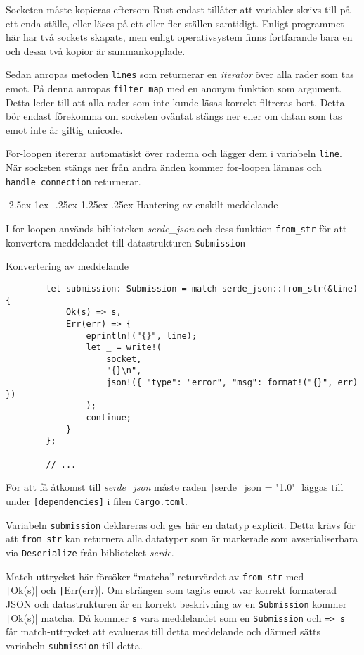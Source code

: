 \documentclass{article}
\makeatletter
\renewcommand\paragraph{\@startsection{paragraph}{4}{\z@}%
			{-2.5ex\@plus -1ex \@minus -.25ex}%
			{1.25ex \@plus .25ex}%
			{\normalfont\normalsize\bfseries}}
\makeatother
\begin{document}
Socketen måste kopieras eftersom Rust endast tillåter att variabler skrivs till
på ett enda ställe, eller läses på ett eller fler ställen samtidigt. Enligt
programmet här har två sockets skapats, men enligt operativsystem finns
fortfarande bara en och dessa två kopior är sammankopplade.

Sedan anropas metoden \texttt{lines} som returnerar en \textit{iterator} över
alla rader som tas emot. På denna anropas \texttt{filter\_map} med en anonym
funktion som argument. Detta leder till att alla rader som inte kunde läsas
korrekt filtreras bort. Detta bör endast förekomma om socketen oväntat stängs
ner eller om datan som tas emot inte är giltig unicode.

For-loopen itererar automatiskt över raderna och lägger dem i variabeln
\texttt{line}. När socketen stängs ner från andra änden kommer for-loopen lämnas
och \texttt{handle\_connection} returnerar.

\paragraph{Hantering av enskilt meddelande}

I for-loopen används biblioteken \textit{serde\_json} och dess funktion
\texttt{from\_str} för att konvertera meddelandet till datastrukturen
\texttt{Submission}

\begin{listing}[H]
	\caption{Konvertering av meddelande}
	\begin{verbatim}
		let submission: Submission = match serde_json::from_str(&line) {
			Ok(s) => s,
			Err(err) => {
				eprintln!("{}", line);
				let _ = write!(
					socket,
					"{}\n",
					json!({ "type": "error", "msg": format!("{}", err) })
				);
				continue;
			}
		};

		// ...
	\end{verbatim}
\end{listing}

För att få åtkomst till \textit{serde\_json} måste raden
\texttt|serde_json = "1.0"| läggas till under \texttt{[dependencies]} i
filen \texttt{Cargo.toml}.

Variabeln \texttt{submission} deklareras och ges här en datatyp explicit. Detta
krävs för att \texttt{from\_str} kan returnera alla datatyper som är markerade
som avserialiserbara via \texttt{Deserialize} från biblioteket \textit{serde}.

Match-uttrycket här försöker ``matcha'' returvärdet av \texttt{from\_str} med \\
\texttt|Ok(s)| och \texttt|Err(err)|. Om strängen
som tagits emot var korrekt formaterad JSON och datastrukturen är en korrekt
beskrivning av en \texttt{Submission} kommer \texttt|Ok(s)|
matcha. Då kommer \texttt{s} vara meddelandet som en \texttt{Submission} och
\texttt{=> s} får match-uttrycket att evalueras till detta meddelande och därmed
sätts variabeln \texttt{submission} till detta.
\end{document}
